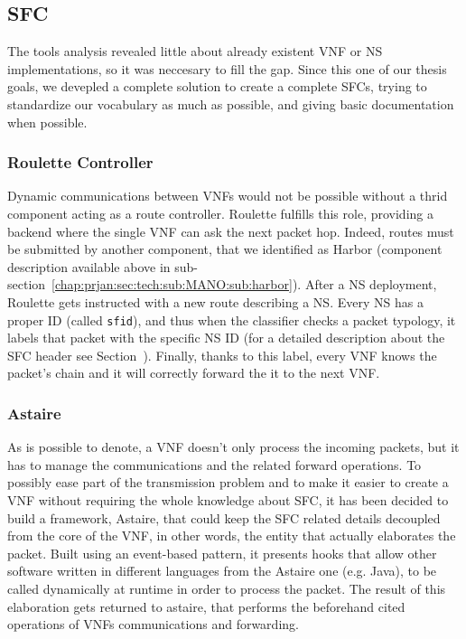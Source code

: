 \subsection{SFC}
The tools analysis revealed little about already existent VNF or NS
implementations, so it was neccesary to fill the gap. Since this one of our
thesis goals, we devepled a complete solution to create a complete SFCs, trying
to standardize our vocabulary as much as possible, and giving basic
documentation when possible.

\subsubsection{Roulette Controller}
\label{chap:prjan:sec:tech:sub:SFC:sub:roulette}
Dynamic communications between VNFs would not be possible without a thrid
component acting as a route controller. Roulette fulfills this role, providing a
backend where the single VNF can ask the next packet hop. Indeed, routes must be
submitted by another component, that we identified as Harbor (component
description available above in
sub-section~\ref{chap:prjan:sec:tech:sub:MANO:sub:harbor}). After a NS
deployment, Roulette gets instructed with a new route describing a NS. Every NS
has a proper ID (called \verb!sfid!), and thus when the classifier checks a
packet typology, it labels that packet with the specific NS ID (for a detailed
description about the SFC header see Section~). Finally, thanks to this label, every VNF knows the packet's chain and
it will correctly forward the it to the next VNF.

\subsubsection{Astaire}
As is possible to denote, a VNF doesn't only process the incoming packets, 
but it has to manage the communications and the related forward operations. To 
possibly ease part of the transmission problem and to make it easier to create a 
VNF without requiring the whole knowledge about SFC, it has been decided to 
build a framework, Astaire, that could keep the SFC related details decoupled 
from the core of the VNF, in other words, the entity that actually elaborates 
the packet. Built using an event-based pattern, it presents hooks that allow 
other software written in different languages from the Astaire one (e.g. Java), 
to be called dynamically at runtime in order to process the packet. The result 
of this elaboration gets returned to astaire, that performs the beforehand 
cited operations of VNFs communications and forwarding.

